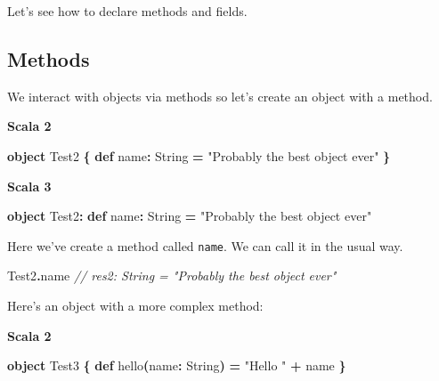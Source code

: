 \documentclass[11pt,a5paper,]{book}
\newenvironment{Shaded}{\begin{snugshade}}{\end{snugshade}}
\newcommand{\CommentTok}[1]{\textcolor[rgb]{0.56,0.35,0.01}{\textit{#1}}}
\newcommand{\ExtensionTok}[1]{#1}
\newcommand{\FunctionTok}[1]{\textcolor[rgb]{0.00,0.00,0.00}{#1}}
\newcommand{\KeywordTok}[1]{\textcolor[rgb]{0.13,0.29,0.53}{\textbf{#1}}}
\newcommand{\NormalTok}[1]{#1}
\newcommand{\OperatorTok}[1]{\textcolor[rgb]{0.81,0.36,0.00}{\textbf{#1}}}
\newcommand{\StringTok}[1]{\textcolor[rgb]{0.31,0.60,0.02}{#1}}
\begin{document}
Let's see how to declare methods and fields.

\hypertarget{methods}{%
\subsection{Methods}\label{methods}}

We interact with objects via methods so let's create an object with a
method.

\textbf{Scala 2}

\begin{Shaded}
\begin{Highlighting}[]
\KeywordTok{object}\NormalTok{ Test2 }\OperatorTok{\{}
  \KeywordTok{def}\NormalTok{ name}\OperatorTok{:} \ExtensionTok{String} \OperatorTok{=} \StringTok{"Probably the best object ever"}
\OperatorTok{\}}
\end{Highlighting}
\end{Shaded}

\textbf{Scala 3}

\begin{Shaded}
\begin{Highlighting}[]
\KeywordTok{object}\NormalTok{ Test2}\OperatorTok{:}
  \KeywordTok{def}\NormalTok{ name}\OperatorTok{:} \ExtensionTok{String} \OperatorTok{=} \StringTok{"Probably the best object ever"}
\end{Highlighting}
\end{Shaded}

Here we've create a method called \texttt{name}. We can call it in the
usual way.

\begin{Shaded}
\begin{Highlighting}[]
\NormalTok{Test2}\OperatorTok{.}\NormalTok{name}
\CommentTok{// res2: String = "Probably the best object ever"}
\end{Highlighting}
\end{Shaded}

Here's an object with a more complex method:

\textbf{Scala 2}

\begin{Shaded}
\begin{Highlighting}[]
\KeywordTok{object}\NormalTok{ Test3 }\OperatorTok{\{}
  \KeywordTok{def} \FunctionTok{hello}\OperatorTok{(}\NormalTok{name}\OperatorTok{:} \ExtensionTok{String}\OperatorTok{)} \OperatorTok{=}
    \StringTok{"Hello "} \OperatorTok{+}\NormalTok{ name}
\OperatorTok{\}}
\end{Highlighting}
\end{Shaded}
\end{document}
